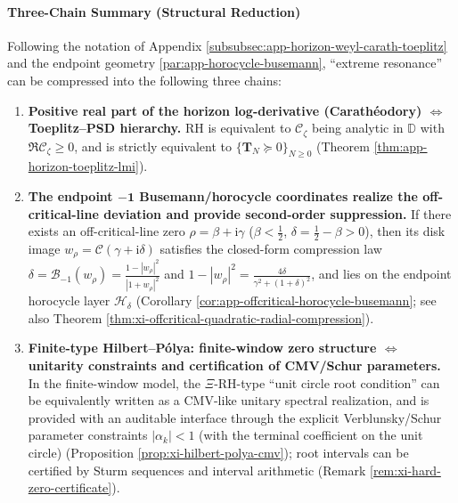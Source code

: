 \paragraph{Three-Chain Summary (Structural Reduction)}
Following the notation of Appendix \ref{subsubsec:app-horizon-weyl-carath-toeplitz} and the endpoint geometry \ref{par:app-horocycle-busemann}, ``extreme resonance'' can be compressed into the following three chains:
\begin{enumerate}
  \item \textbf{Positive real part of the horizon log-derivative (Carath\'eodory) \(\Longleftrightarrow\) Toeplitz--PSD hierarchy.}
  RH is equivalent to \(\mathscr{C}_{\zeta}\) being analytic in \(\mathbb{D}\) with \(\Re \mathscr{C}_{\zeta}\ge 0\), and is strictly equivalent to \(\{\mathbf{T}_N\succeq 0\}_{N\ge 0}\) (Theorem \ref{thm:app-horizon-toeplitz-lmi}).
  \item \textbf{The endpoint \(\boldsymbol{-1}\) Busemann/horocycle coordinates realize the off-critical-line deviation and provide second-order suppression.}
  If there exists an off-critical-line zero \(\rho=\beta+\mathrm{i}\gamma\) (\(\beta<\tfrac12\), \(\delta=\tfrac12-\beta>0\)), then its disk image \(w_\rho=\mathcal{C}(\gamma+\mathrm{i}\delta)\) satisfies the closed-form compression law
  \(\delta=\mathcal{B}_{-1}(w_\rho)=\frac{1-|w_\rho|^2}{|1+w_\rho|^2}\) and
  \(1-|w_\rho|^2=\frac{4\delta}{\gamma^2+(1+\delta)^2}\), and lies on the endpoint horocycle layer \(\mathcal{H}_\delta\) (Corollary \ref{cor:app-offcritical-horocycle-busemann}; see also Theorem \ref{thm:xi-offcritical-quadratic-radial-compression}).
  \item \textbf{Finite-type Hilbert--P{\'o}lya: finite-window zero structure \(\Longleftrightarrow\) unitarity constraints and certification of CMV/Schur parameters.}
  In the finite-window model, the \(\Xi\)-RH-type ``unit circle root condition'' can be equivalently written as a CMV-like unitary spectral realization, and is provided with an auditable interface through the explicit Verblunsky/Schur parameter constraints \(|\alpha_k|<1\) (with the terminal coefficient on the unit circle) (Proposition \ref{prop:xi-hilbert-polya-cmv}); root intervals can be certified by Sturm sequences and interval arithmetic (Remark \ref{rem:xi-hard-zero-certificate}).
\end{enumerate}

